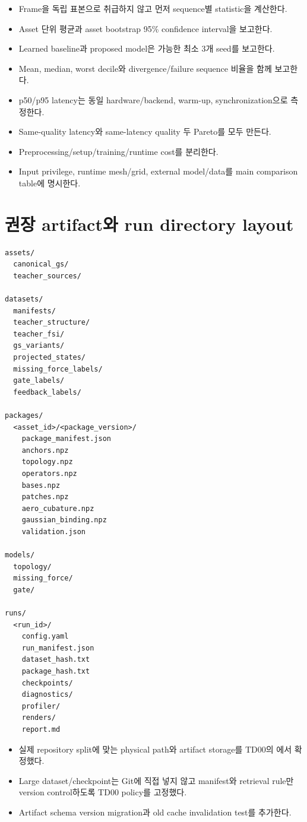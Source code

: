 \documentclass[10pt,a4paper]{article}
\newcommand{\todo}{\textcolor{TodoGray}{\(\square\)}}
\newcommand{\done}{\textcolor{DoneGreen}{\(\boxtimes\)}}
\begin{document}
\begin{itemize}
  \item[\todo] Frame을 독립 표본으로 취급하지 않고 먼저 sequence별 statistic을 계산한다.
  \item[\todo] Asset 단위 평균과 asset bootstrap 95\% confidence interval을 보고한다.
  \item[\todo] Learned baseline과 proposed model은 가능한 최소 3개 seed를 보고한다.
  \item[\todo] Mean, median, worst decile와 divergence/failure sequence 비율을 함께 보고한다.
  \item[\todo] p50/p95 latency는 동일 hardware/backend, warm-up, synchronization으로 측정한다.
  \item[\todo] Same-quality latency와 same-latency quality 두 Pareto를 모두 만든다.
  \item[\todo] Preprocessing/setup/training/runtime cost를 분리한다.
  \item[\todo] Input privilege, runtime mesh/grid, external model/data를 main comparison table에 명시한다.
\end{itemize}

\section{권장 artifact와 run directory layout}

\begin{lstlisting}
assets/
  canonical_gs/
  teacher_sources/

datasets/
  manifests/
  teacher_structure/
  teacher_fsi/
  gs_variants/
  projected_states/
  missing_force_labels/
  gate_labels/
  feedback_labels/

packages/
  <asset_id>/<package_version>/
    package_manifest.json
    anchors.npz
    topology.npz
    operators.npz
    bases.npz
    patches.npz
    aero_cubature.npz
    gaussian_binding.npz
    validation.json

models/
  topology/
  missing_force/
  gate/

runs/
  <run_id>/
    config.yaml
    run_manifest.json
    dataset_hash.txt
    package_hash.txt
    checkpoints/
    diagnostics/
    profiler/
    renders/
    report.md
\end{lstlisting}

\begin{itemize}
  \item[\done] 실제 repository split에 맞는 physical path와 artifact storage를 TD00의 에서 확정했다.
  \item[\done] Large dataset/checkpoint는 Git에 직접 넣지 않고 manifest와 retrieval rule만 version control하도록 TD00 policy를 고정했다.
  \item[\todo] Artifact schema version migration과 old cache invalidation test를 추가한다.
\end{itemize}
\end{document}
